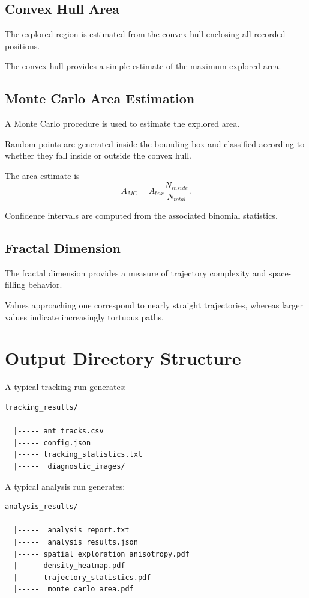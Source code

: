 \documentclass[11pt,a4paper]{article}
\begin{document}
\subsection{Convex Hull Area}

The explored region is estimated from the convex hull enclosing all recorded positions.

The convex hull provides a simple estimate of the maximum explored area.

\subsection{Monte Carlo Area Estimation}

A Monte Carlo procedure is used to estimate the explored area.

Random points are generated inside the bounding box and classified according to whether they fall inside or outside the convex hull.

The area estimate is
\begin{equation}
A_{MC}= A_{box} \frac{N_{inside}} {N_{total}}.
\end{equation}

Confidence intervals are computed from the associated binomial statistics.

\subsection{Fractal Dimension}

The fractal dimension provides a measure of trajectory complexity and space-filling behavior.

Values approaching one correspond to nearly straight trajectories, whereas larger values indicate increasingly tortuous paths.

\section{Output Directory Structure}

A typical tracking run generates:

\begin{verbatim}
tracking_results/

  |----- ant_tracks.csv
  |----- config.json
  |----- tracking_statistics.txt
  |-----  diagnostic_images/
\end{verbatim}

A typical analysis run generates:

\begin{verbatim}
analysis_results/

  |-----  analysis_report.txt
  |-----  analysis_results.json
  |----- spatial_exploration_anisotropy.pdf
  |----- density_heatmap.pdf
  |----- trajectory_statistics.pdf
  |-----  monte_carlo_area.pdf
\end{verbatim}
\end{document}
